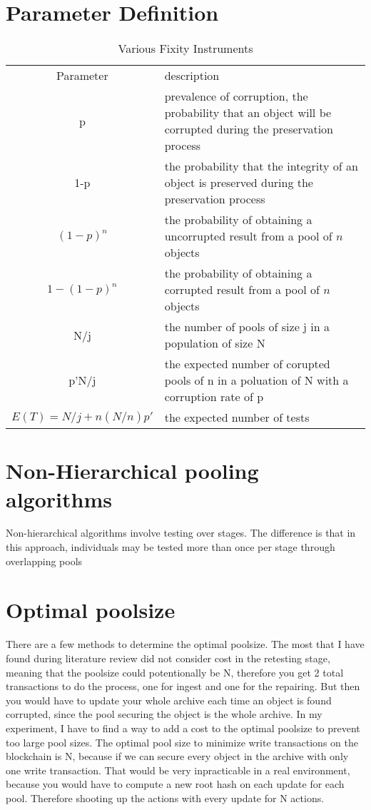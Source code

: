 \section{Parameter Definition}
\begin{table}[t]
    \centering
    \caption{Various Fixity Instruments \cite[6]{ndsa2017fixity}}
    \label{tb:parameter-definition}
    \begin{tabular}{ c p{} }
        Parameter     &  description \\
        p     &  prevalence of corruption, the probability that an object will be corrupted during the preservation process \\
        1-p   &  the probability that the integrity of an object is preserved during the preservation process \\   
        $(1-p)^n$ &  the probability of obtaining a uncorrupted result from a pool of $n$ objects \\  
        $1 - (1-p)^n$ &  the probability of obtaining a corrupted result from a pool of $n$ objects \\  
        N/j & the number of pools of size j in a population of size N \\  
        p'N/j & the expected number of corupted pools of n in a poluation of N with a corruption rate of p \\  
        $E(T) = N/j + n(N/n)p'$ & the expected number of tests 
    \end{tabular}
\end{table}
\cite[3]{dorfman1943detection}
\section{Non-Hierarchical pooling algorithms}
Non-hierarchical algorithms involve testing over stages. The difference is that in this approach, individuals may be tested more than once per stage through overlapping pools \cite[3]{lagopati2021sample}
\section{Optimal poolsize}
There are a few methods to determine the optimal poolsize. The most that I have found during literature review did not consider cost in the retesting stage, meaning that the poolsize could potentionally be N, therefore you get 2 total transactions to do the process, one for ingest and one for the repairing. But then you would have to update your whole archive each time an object is found corrupted, since the pool securing the object is the whole archive. In my experiment, I have to find a way to add a cost to the optimal poolsize to prevent too large pool sizes.
The optimal pool size to minimize write transactions on the blockchain is N, because if we can secure every object in the archive with only one write transaction. That would be very inpracticable in a real environment, because you would have to compute a new root hash on each update for each pool. Therefore shooting up the actions with every update for N actions.
 